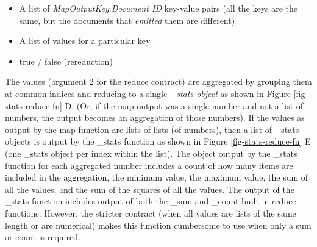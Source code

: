 \begin{itemize}
    \item A list of \textit{MapOutputKey}:\textit{Document ID} key-value pairs (all the keys are the same, but the documents that \textit{emitted} them are different)
    \item A list of values for a particular key
    \item true / false (rereduction)
\end{itemize}

The values (argument 2 for the reduce contract) are aggregated by grouping them at common indices and reducing to a single \textit{\_stats object} as shown in Figure \ref{fig-stats-reduce-fn} D. (Or, if the map output was a single number and not a list of numbers, the output becomes an aggregation of those numbers). If the values as output by the map function are lists of lists (of numbers), then a list of \_stats objects is output by the \_stats function as shown in Figure \ref{fig-stats-reduce-fn} E (one \_stats object per index within the list). The object output by the \_stats function for each aggregated number includes a count of how many items are included in the aggregation, the minimum value, the maximum value, the sum of all the values, and the sum of the squares of all the values. The output of the \_stats function includes output of both the \_sum and \_count built-in reduce functions. However, the stricter contract (when all values are lists of the same length or are numerical) makes this function cumbersome to use when only a sum or count is required.

